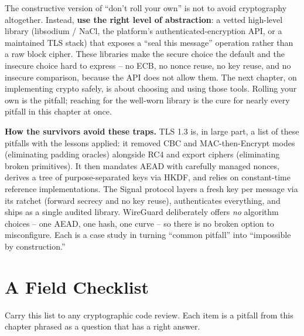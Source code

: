\begin{focusbox}
The constructive version of ``don't roll your own'' is not to avoid cryptography altogether. Instead, \textbf{use the right level of abstraction}: a vetted high-level library (libsodium / NaCl, the platform's authenticated-encryption API, or a maintained TLS stack) that exposes a ``seal this message'' operation rather than a raw block cipher. These libraries make the secure choice the default and the insecure choice hard to express -- no ECB, no nonce reuse, no key reuse, and no insecure comparison, because the API does not allow them. The next chapter, on implementing crypto safely, is about choosing and using those tools. Rolling your own is the pitfall; reaching for the well-worn library is the cure for nearly every pitfall in this chapter at once.
\end{focusbox}

\begin{applicationbox}
\textbf{How the survivors avoid these traps.} TLS 1.3 is, in large part, a list of these pitfalls with the lessons applied: it removed CBC and MAC-then-Encrypt modes (eliminating padding oracles) alongside RC4 and export ciphers (eliminating broken primitives). It then mandates AEAD with carefully managed nonces, derives a tree of purpose-separated keys via HKDF, and relies on constant-time reference implementations. The Signal protocol layers a fresh key per message via its ratchet (forward secrecy and no key reuse), authenticates everything, and ships as a single audited library. WireGuard deliberately offers \emph{no} algorithm choices -- one AEAD, one hash, one curve -- so there is no broken option to misconfigure. Each is a case study in turning ``common pitfall'' into ``impossible by construction.''
\end{applicationbox}

\section{A Field Checklist}
\label{ch38:checklist}

Carry this list to any cryptographic code review. Each item is a pitfall from this chapter phrased as a question that has a right answer.

